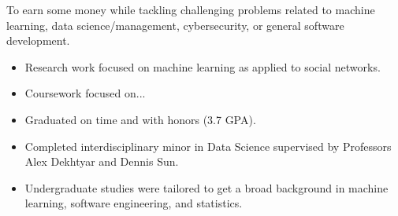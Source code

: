 \sffamily

To earn some money while tackling challenging problems related to machine learning, data science/management, 
cybersecurity, or general software development.


\begin{itemize}
    \item Research work focused on machine learning as applied to social networks.
    \item Coursework focused on...
\end{itemize}
\divider


\begin{itemize}
    \item Graduated on time and with honors (3.7 GPA).
    \item Completed interdisciplinary minor in Data Science supervised by Professors Alex Dekhtyar and Dennis Sun.
    \item Undergraduate studies were tailored to get a broad background in machine learning, software engineering, and statistics.
\end{itemize}

\smallskip







